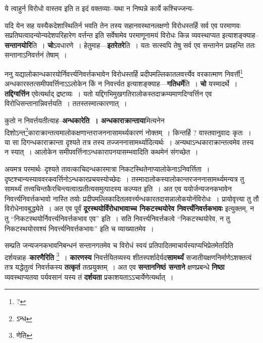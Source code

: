 \documentclass[article,12pt,a4paper]{memoir}
\begin{document}
	  \pstart ये त्वाहुर्न विरोधो वास्तव इति त इदं वक्तव्याः--यथा न निष्पन्ने कार्ये कश्चिज्जन्य-
	\pend
      
	  \endgroup
	

	  \pstart यदि येन सह यस्यैकदेशास्थितिर्न भवति तेन तस्य सहानवस्थानलक्षणो विरोधस्तर्हि सर्व एव परमाणवः सप्रतिघत्वादन्योन्यदेशपरिहारेण वर्त्तन्त इति सर्वेषामेव परमाणूनामयं विरोधः किन्न व्यवस्थाप्यत इत्याशङ्क्याह--\textbf{सन्तानयोरि}ति । \textbf{चो}ऽवधारणे । हेतुमाह—\textbf{इतरेतरे}ति । यतः सत्स्वपि तेषु सर्व एव सन्तानेन प्रवहन्ति ततः सन्तानाऽनिवर्त्तनं तेषाम् ।
	\pend
      

	  \pstart ननु यद्यालोकान्धकारयोर्निवर्त्त्यनिवर्त्तकभावेन विरोधस्तर्हि प्रदीपमल्लिकातलवर्त्त्येव वरकात्माण निवर्त्ती\footnote{?} अन्धकारस्तत्समीपवर्त्तिनाऽऽलोकेन किं न निवर्त्त्यत इत्याशङ्क्याह—\textbf{गतिधर्मे}ति । \textbf{चो} यस्मादर्थे । \textbf{तद्दिग्वर्त्तिन} एवेत्यर्थाद् द्रष्टव्यः । यतो यद्दिगभिमुखगतिरालोकस्तदाक्रम्यमाणदिग्वर्त्तिन एव विरोधिसन्तानान्निवर्त्तयति । ततस्तस्मात्कारणात् ।
	\pend
      

	  \pstart कुतो न निवर्त्तयतीत्याह--\textbf{अन्धकारेति । अन्धकाराक्रान्ताया}मित्यनेन दिशोऽन्त\footnote{ऽन्ध}काराक्रान्तत्वमालोकक्षणान्तराजननासामर्थ्यकारणं नोक्तम् । किन्तर्हि ? वास्तवानुवादः कृतः । या सा दिगन्धकाराक्रान्ता दृश्यते तत्र तस्य तज्जननासामर्थ्यादित्यर्थः । अन्यथाऽन्धकाराक्रान्तत्वमेव तस्य न स्यात् । आलोकेन समीपवर्त्तिनाऽन्धकारापनयासम्भवादिति कथमेनं संगच्छेत ।
	\pend
      

	  \pstart अयमत्र परमार्थः--दृश्यते तावत्काचिदन्धकारमात्रा निकटस्थितेनाप्यालोकेनाऽनिवर्त्तिता । दृष्टश्चान्यस्याववरकवर्त्तिनोऽन्धकारप्रचयस्योच्छेदः । तस्मादालोकस्यालोकान्तरजननासामर्थ्यमन्यत्र तु सामर्थ्यं तत्त्वचिन्तकैरचिन्त्यत्वात्प्रतीत्यसमुत्पादस्य कल्प्यत इति । अत एव ययोर्जन्यजनकभावेन निवर्त्त्यनिवर्त्तकभावो नास्ति तयोः प्रदीपमल्लिकादितलवर्त्त्यन्धकारतदासन्नालोकयोर्नविरोधः । प्रायोवृत्त्या तु तौ विरोधेनावबुद्ध्येते । अत एव पूर्वं \textbf{दूरस्थयोर्विंरोधाभावाच्च निकटस्थयोरेव निवर्त्त्यंनिवर्त्तकभावः\textbf{}} इत्युक्तम्, न तु “निकटस्थयोर्निवर्त्त्यनिवर्त्तकभाव एव” इति । सति निवर्त्त्यनिवर्त्तकत्वे “निकटस्थयोरेव, न तु निकटस्थयोरवश्यं निवर्त्त्यनिवर्त्तकभावः” इति च व्याख्यातमेव ।
	\pend
      

	  \pstart सम्प्रति जन्यजनकभावनिबन्धनं सन्तानगतमेव च विरोधं स्वयं प्रतिपादितमाचार्यस्याप्यभिप्रेतमेतदिति दर्शयन्नाह--\textbf{कारणैरिति} \footnote{णेति} । \textbf{कारणस्य} निवर्त्तयितव्यस्य शीतस्पर्शादेर्यद\textbf{सामर्थ्यं} सजातीयक्षणनिर्माणेऽशक्तत्वं तत्र यद्धेतुत्वं निवर्त्तकस्य \textbf{तत्कृतं} तत्प्रयुक्तम् । अत एव \textbf{सन्ताननिष्ठं सन्ताने} क्षणप्रबन्धे \textbf{निष्ठा} व्यवस्थाप्यतया पर्यवसानं यस्य तं \textbf{दर्शयता} प्रकाश\leavevmode{}यताऽऽचार्येणेत्यर्थात् ।
	\pend
      
\end{document}
